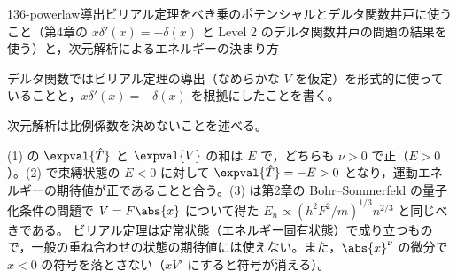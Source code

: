 \documentclass[uplatex,dvipdfmx,a4paper,11pt]{jsarticle}
\begin{document}
\begin{mondai}{136-powerlaw}{導出}{ビリアル定理をべき乗のポテンシャルとデルタ関数井戸に使うこと（第4章の $x\delta'(x)=-\delta(x)$ と Level 2 のデルタ関数井戸の問題の結果を使う）と，次元解析によるエネルギーの決まり方}
\begin{tadashii}
\begin{ronten}
  \item {} デルタ関数ではビリアル定理の導出（なめらかな $V$ を仮定）を形式的に使っていることと，$x\delta'(x)=-\delta(x)$ を根拠にしたことを書く。
  \item {} 次元解析は比例係数を決めないことを述べる。
\end{ronten}
\kenzan (1) の $\expval{\hat{T}}$ と $\expval{V}$ の和は $E$ で，どちらも $\nu>0$ で正（$E>0$）。(2) で束縛状態の $E<0$ に対して $\expval{\hat{T}}=-E>0$ となり，運動エネルギーの期待値が正であることと合う。(3) は第2章の Bohr--Sommerfeld の量子化条件の問題で $V=F\abs{x}$ について得た $E_{n}\propto(h^{2}F^{2}/m)^{1/3}n^{2/3}$ と同じべきである。
\tsumazuki ビリアル定理は定常状態（エネルギー固有状態）で成り立つもので，一般の重ね合わせの状態の期待値には使えない。また，$\abs{x}^{\nu}$ の微分で $x<0$ の符号を落とさない（$xV'$ にすると符号が消える）。
\end{tadashii}
\end{mondai}

\noteowari
\end{document}
